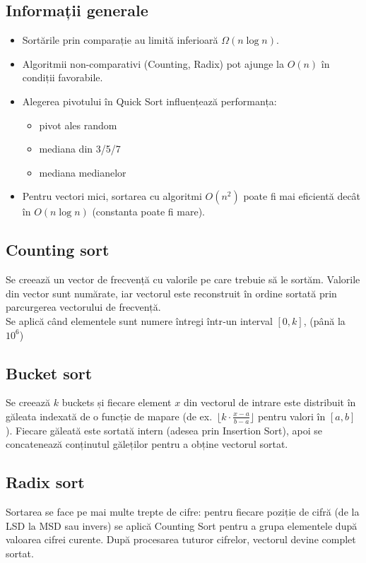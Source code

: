 \documentclass[11pt,a4paper]{article}
\theoremstyle{definition}
\theoremstyle{plain}
\theoremstyle{remark}
\begin{document}
\subsection{Informații generale}
\begin{itemize}
  \item Sortările prin comparație au limită inferioară $\Omega(n\log n)$.
  \item Algoritmii non-comparativi (Counting, Radix) pot ajunge la $O(n)$ în condiții favorabile.
  \item Alegerea pivotului în Quick Sort influențează performanța:
  \begin{itemize}
    \item pivot ales random
    \item mediana din 3/5/7
    \item mediana medianelor
  \end{itemize}
  \item Pentru vectori mici, sortarea cu algoritmi $O(n^2)$ poate fi mai eficientă decât în $O(n\log n)$ (constanta poate fi mare).
\end{itemize}

\subsection{Counting sort}
Se creează un vector de frecvență cu valorile pe care trebuie să le sortăm. Valorile din vector sunt numărate, iar vectorul este reconstruit în ordine
sortată prin parcurgerea vectorului de frecvență.\\

\noindent
Se aplică când elementele sunt numere întregi într‐un interval \([0, k]\), (până la $10^6$)

\subsection{Bucket sort}
Se creează $k$ buckets și fiecare element $x$ din vectorul de intrare este distribuit în găleata indexată de o funcție de mapare (de ex.\ $\lfloor k\cdot\frac{x-a}{b-a}\rfloor$ pentru valori în $[a,b]$). Fiecare găleată este sortată intern (adesea prin Insertion Sort), apoi se concatenează conținutul găleților pentru a obține vectorul sortat.\\

\subsection{Radix sort}
Sortarea se face pe mai multe trepte de cifre: pentru fiecare poziție de cifră (de la LSD la MSD sau invers) se aplică Counting Sort pentru a grupa elementele după valoarea cifrei curente. După procesarea tuturor cifrelor, vectorul devine complet sortat.\\
\end{document}
